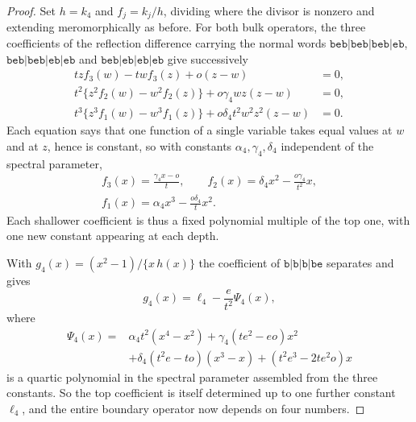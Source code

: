 \documentclass[
  aps,pre,
  reprint,
  superscriptaddress,
  amsmath,amssymb,
  floatfix
]{revtex4-2}
\theoremstyle{plain}
\theoremstyle{definition}
\theoremstyle{remark}
\begin{document}
\begin{proof}
Set $h=k_4$ and $f_j=k_j/h$, dividing where the divisor is nonzero and
extending meromorphically as before. For both bulk operators, the three
coefficients of the reflection difference carrying the normal words
$\mathtt{beb|beb|beb|eb}$, $\mathtt{beb|beb|eb|eb}$ and
$\mathtt{beb|eb|eb|eb}$ give successively
\begin{align}
 tzf_3(w)-twf_3(z)+o(z-w)&=0,\nonumber\\
 t^2\{z^2f_2(w)-w^2f_2(z)\}+o\gamma_4wz(z-w)&=0,\nonumber\\
 t^3\{z^3f_1(w)-w^3f_1(z)\}+o\delta_4t^2w^2z^2(z-w)&=0 .
 \label{eq:r4-chain}
\end{align}
Each equation says that one function of a single variable takes equal values at
$w$ and at $z$, hence is constant, so with constants
$\alpha_4,\gamma_4,\delta_4$ independent of the spectral parameter,
\begin{equation}
 \begin{gathered}
 f_3(x)=\frac{\gamma_4x-o}{t},\qquad
 f_2(x)=\delta_4x^2-\frac{o\gamma_4}{t^2}x,\\
 f_1(x)=\alpha_4x^3-\frac{o\delta_4}{t}x^2 .
 \end{gathered}
 \label{eq:r4-ratios}
\end{equation}
Each shallower coefficient is thus a fixed polynomial multiple of the top one,
with one new constant appearing at each depth.

With $g_4(x)=(x^2-1)/\{x\,h(x)\}$ the coefficient of $\mathtt{b|b|b|be}$
separates and gives
\begin{equation}
 g_4(x)=\ell_4-\frac{e}{t^2}\Psi_4(x),
 \label{eq:r4-master}
\end{equation}
where
\begin{equation}
\begin{split}
 \Psi_4(x)={}&\alpha_4t^2(x^4-x^2)+\gamma_4(te^2-eo)x^2\\
 &+\delta_4(t^2e-to)(x^3-x)+(t^2e^3-2te^2o)x
\end{split}
 \label{eq:psi4}
\end{equation}
is a quartic polynomial in the spectral parameter assembled from the three
constants. So the top coefficient is itself determined up to one further
constant $\ell_4$, and the entire boundary operator now depends on four
numbers.


\end{proof}
\end{document}
